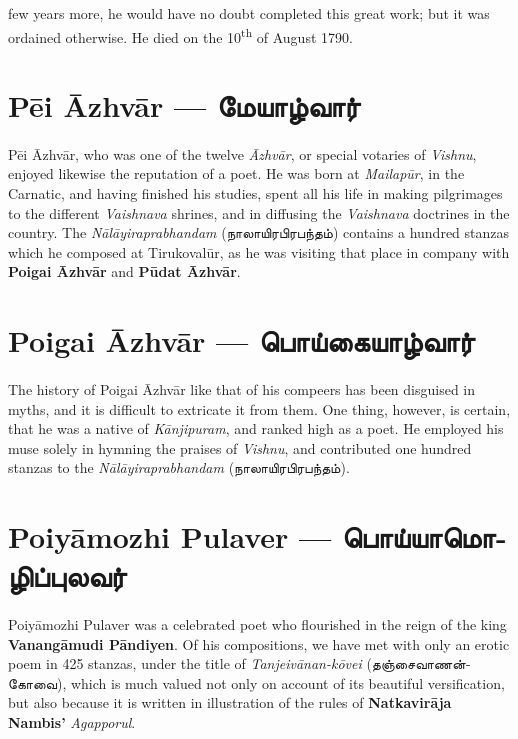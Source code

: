 \documentclass{article}
\newcommand{\TamilText}[1]{\texttamil{#1}}
\newcommand{\TamilBold}[1]{\texttamil{\textbf{#1}}}
\newcommand{\tam}[1]{\TamilText{#1}}
\newcommand{\tambold}[1]{\TamilBold{#1}}
\begin{document}
few years more, he would have no doubt completed this great work; but it was ordained otherwise. He died on the 10\textsuperscript{th} of August 1790.

\section{P\={e}i \={A}zhv\={a}r --- \tambold{மேயாழ்வார்}}
\paragraph{}
P\={e}i \={A}zhv\={a}r, who was one of the twelve \emph{\={A}zhv\={a}r}, or special votaries of \emph{Vishnu}, enjoyed likewise the reputation of a poet. He was born at \emph{Mailap\={u}r}, in the Carnatic, and having finished his studies, spent all his life in making pilgrimages to the different \emph{Vaishnava} shrines, and in diffusing the \emph{Vaishnava} doctrines in the country. The \emph{N\={a}l\={a}yiraprabhandam} (\tam{நாலாயிரபிரபந்தம்}) contains a hundred stanzas which he composed at Tirukoval\={u}r, as he was visiting that place in company with \textbf{Poigai \={A}zhv\={a}r} and \textbf{P\={u}dat \={A}zhv\={a}r}.

\section{Poigai \={A}zhv\={a}r --- \tambold{பொய்கையாழ்வார்}}
\paragraph{}
The history of Poigai \={A}zhv\={a}r like that of his compeers has been disguised in myths, and it is difficult to extricate it from them. One thing, however, is certain, that he was a native of \emph{K\={a}njipuram}, and ranked high as a poet. He employed his muse solely in hymning the praises of \emph{Vishnu}, and contributed one hundred stanzas to the \emph{N\={a}l\={a}yiraprabhandam} (\tam{நாலாயிரபிரபந்தம்}).

\section{Poiy\={a}mozhi Pulaver --- \tambold{பொய்யாமொழிப்புலவர்}}
\paragraph{}
Poiy\={a}mozhi Pulaver was a celebrated poet who flourished in the reign of the king \textbf{Vanang\={a}mudi P\={a}ndiyen}. Of his compositions, we have met with only an erotic poem in 425 stanzas, under the title of \emph{Tanjeiv\={a}nan-k\={o}vei} (\tam{தஞ்சைவாணன்கோவை}), which is much valued not only on account of its beautiful versification, but also because it is written in illustration of the rules of \textbf{Natkavir\={a}ja Nambis'} \emph{Agapporul}.
\end{document}
